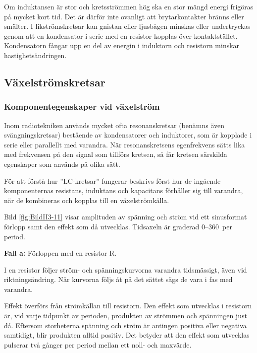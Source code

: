 Om induktansen är stor och kretsströmmen hög ska en stor mängd energi frigöras på mycket kort tid.
Det är därför inte ovanligt att brytarkontakter bränns eller smälter.
I likströmskretsar kan gnistan eller ljusbågen minskas eller undertryckas genom
att en kondensator i serie med en resistor kopplas över kontaktstället.
Kondensatorn fångar upp en del av energin i induktorn och resistorn minskar hastighetsändringen.

\subsection{Växelströmskretsar}

\subsubsection{Komponentegenskaper vid växelström}

Inom radiotekniken används mycket ofta resonanskretsar (benämns även
svängningskretsar) bestående av kondensatorer och induktorer, som är kopplade i
serie eller parallellt med varandra.
När resonanskretsens egenfrekvens sätts lika med frekvensen på den signal som
tillförs kretsen, så får kretsen särskilda egenskaper som används på olika sätt.

För att förstå hur ''LC-kretsar'' fungerar beskrivs först hur de ingående
komponenternas resistans, induktans och kapacitans förhåller sig till varandra,
när de kombineras och kopplas till en växelströmkälla.


Bild \ref{fig:BildII3-11} visar amplituden av spänning och ström vid ett
sinusformat förlopp samt den effekt som då utvecklas.
Tidsaxeln är graderad 0--360\degree~per period.

\textbf{Fall a:} Förloppen med en resistor R.

I en resistor följer ström- och spänningskurvorna varandra tidsmässigt, även
vid riktningsändring.
När kurvorna följs åt på det sättet sägs de vara i fas med varandra.

Effekt överförs från strömkällan till resistorn.
Den effekt som utvecklas i resistorn är, vid varje tidpunkt av perioden,
produkten av strömmen och spänningen just då.
Eftersom storheterna spänning och ström är antingen positiva eller negativa
samtidigt, blir produkten alltid positiv.
Det betyder att den effekt som utvecklas pulserar två gånger per period mellan
ett noll- och maxvärde.

